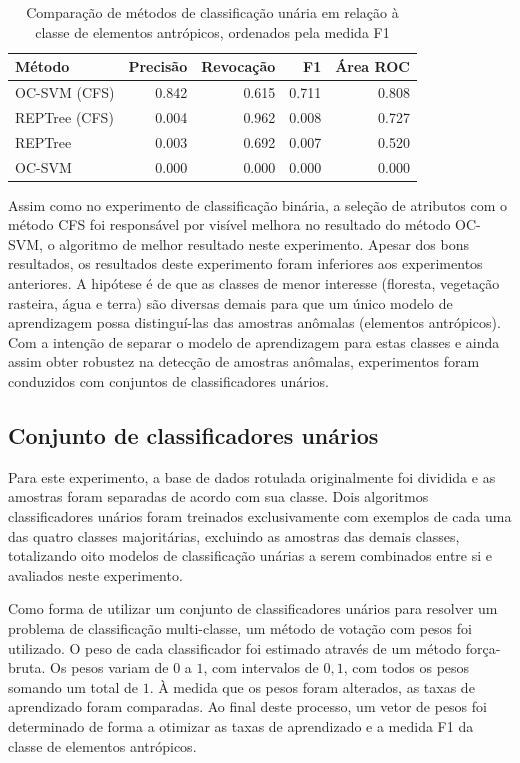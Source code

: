 \begin{table}[h]
\centering
\begin{tabulary}{\linewidth}{|L|R|R|R|R|}
\hline
\textbf{Método} & \textbf{Precisão} & \textbf{Revocação} & \textbf{F1} & \textbf{Área ROC} \\ \hline
OC-SVM (CFS)  & 0.842 & 0.615 & 0.711 & 0.808 \\ \hline
REPTree (CFS) & 0.004 & 0.962 & 0.008 & 0.727 \\ \hline
REPTree       & 0.003 & 0.692 & 0.007 & 0.520 \\ \hline
OC-SVM        & 0.000 & 0.000 & 0.000 & 0.000 \\ \hline
\end{tabulary}
\caption{Comparação de métodos de classificação unária em relação à classe de elementos antrópicos, ordenados pela medida F1}
\label{tab:experimentoUniclasseAntropico}
\end{table}

Assim como no experimento de classificação binária, a seleção de atributos com o método CFS foi responsável por visível melhora no resultado do método OC-SVM, o algoritmo de melhor resultado neste experimento. Apesar dos bons resultados, os resultados deste experimento foram inferiores aos experimentos anteriores. A hipótese é de que as classes de menor interesse (floresta, vegetação rasteira, água e terra) são diversas demais para que um único modelo de aprendizagem possa distinguí-las das amostras anômalas (elementos antrópicos). Com a intenção de separar o modelo de aprendizagem para estas classes e ainda assim obter robustez na detecção de amostras anômalas, experimentos foram conduzidos com conjuntos de classificadores unários.

\subsection{Conjunto de classificadores unários}

Para este experimento, a base de dados rotulada originalmente foi dividida e as amostras foram separadas de acordo com sua classe. Dois algoritmos classificadores unários foram treinados exclusivamente com exemplos de cada uma das quatro classes majoritárias, excluindo as amostras das demais classes, totalizando oito modelos de classificação unárias a serem combinados entre si e avaliados neste experimento.

Como forma de utilizar um conjunto de classificadores unários para resolver um problema de classificação multi-classe, um método de votação com pesos foi utilizado. O peso de cada classificador foi estimado através de um método força-bruta. Os pesos variam de $0$ a $1$, com intervalos de $0,1$, com todos os pesos somando um total de $1$. À medida que os pesos foram alterados, as taxas de aprendizado foram comparadas. Ao final deste processo, um vetor de pesos foi determinado de forma a otimizar as taxas de aprendizado e a medida F1 da classe de elementos antrópicos.

